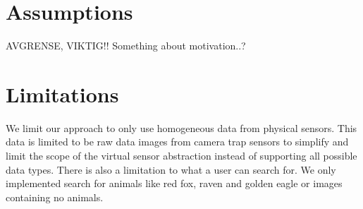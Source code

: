 \documentclass[USenglish]{uit-thesis}
\begin{document}

\section{Assumptions}
AVGRENSE, VIKTIG!!
Something about motivation..?

\section{Limitations}

We limit our approach to only use homogeneous data from physical sensors.  This data is limited to be raw data images from camera trap sensors to simplify and limit the scope of the virtual sensor abstraction instead of supporting all possible data types.
There is also a limitation to what a user can search for. We only implemented search for animals like red fox, raven and golden eagle or images containing no animals.










\end{document}
